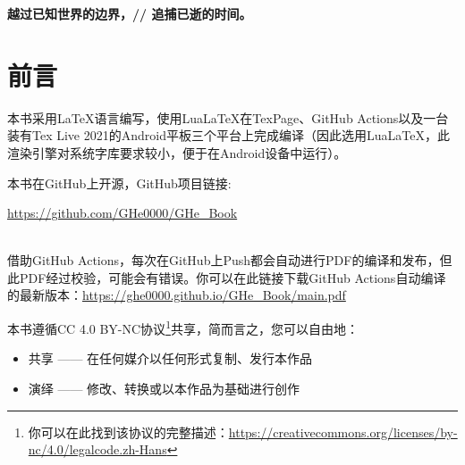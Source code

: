 \documentclass{gbook}
\begin{document}
\everymath{\displaystyle}

\setlength{\lineskip}{2.5pt}
\setlength{\lineskiplimit}{2.5pt}

 

\newpage

\thispagestyle{empty}
\vspace*{\fill}
\begin{center}
\Huge{\textbf{越过已知世界的边界，//
追捕已逝的时间。}}
\end{center}
\vspace*{\fill}

\newpage


\setcounter{page}{1}

\section*{前言}


本书采用\LaTeX 语言编写，使用Lua\LaTeX 在TexPage、GitHub Actions以及一台装有Tex Live 2021的Android平板三个平台上完成编译（因此选用Lua\LaTeX，此渲染引擎对系统字库要求较小，便于在Android设备中运行）。
~\\

\begin{minipage}[b]{0.62\linewidth}
本书在GitHub上开源，GitHub项目链接:

\url{https://github.com/GHe0000/GHe_Book} 
\end{minipage}
\hfill
\begin{minipage}[b]{0.1\linewidth}
\end{minipage}
~\\

借助GitHub Actions，每次在GitHub上Push都会自动进行PDF的编译和发布，但此PDF经过校验，可能会有错误。你可以在此链接下载GitHub Actions自动编译的最新版本：\url{https://ghe0000.github.io/GHe_Book/main.pdf}

本书遵循CC 4.0 BY-NC协议\footnote{你可以在此找到该协议的完整描述：\url{https://creativecommons.org/licenses/by-nc/4.0/legalcode.zh-Hans}}共享，简而言之，您可以自由地：
\begin{itemize}
    \item 共享 —— 在任何媒介以任何形式复制、发行本作品
    \item 演绎 —— 修改、转换或以本作品为基础进行创作
\end{itemize}
\end{document}
